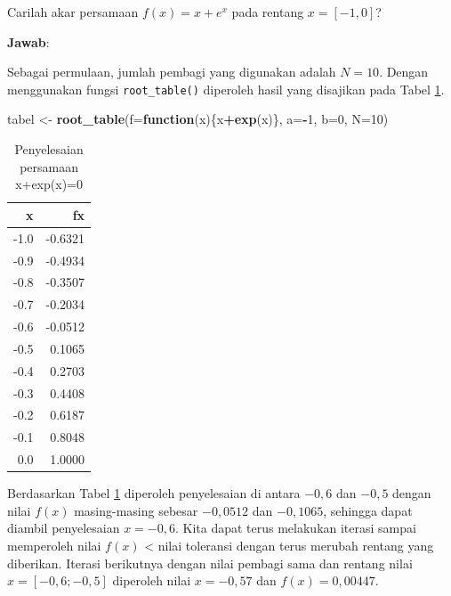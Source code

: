 \documentclass[]{book}
\newenvironment{Shaded}{\begin{snugshade}}{\end{snugshade}}
\newcommand{\ControlFlowTok}[1]{\textcolor[rgb]{0.13,0.29,0.53}{\textbf{#1}}}
\newcommand{\DataTypeTok}[1]{\textcolor[rgb]{0.13,0.29,0.53}{#1}}
\newcommand{\DecValTok}[1]{\textcolor[rgb]{0.00,0.00,0.81}{#1}}
\newcommand{\KeywordTok}[1]{\textcolor[rgb]{0.13,0.29,0.53}{\textbf{#1}}}
\newcommand{\NormalTok}[1]{#1}
\newcommand{\OperatorTok}[1]{\textcolor[rgb]{0.81,0.36,0.00}{\textbf{#1}}}
\newcommand{\StringTok}[1]{\textcolor[rgb]{0.31,0.60,0.02}{#1}}
\theoremstyle{definition}
\theoremstyle{definition}
\theoremstyle{definition}
\theoremstyle{remark}
\let\BeginKnitrBlock\begin \let\EndKnitrBlock\end
\begin{document}
\BeginKnitrBlock{example}
\protect\hypertarget{exm:tabelexmp}{}{\label{exm:tabelexmp} }Carilah akar persamaan \(f\left(x \right)=x+e^{x}\) pada rentang \(x=\left[-1,0 \right]\)?
\EndKnitrBlock{example}

\textbf{Jawab}:

Sebagai permulaan, jumlah pembagi yang digunakan adalah \(N=10\). Dengan menggunakan fungsi \texttt{root\_table()} diperoleh hasil yang disajikan pada Tabel \ref{tab:tabeltabel}.

\begin{Shaded}
\begin{Highlighting}[]
\NormalTok{tabel <-}\StringTok{ }\KeywordTok{root_table}\NormalTok{(}\DataTypeTok{f=}\ControlFlowTok{function}\NormalTok{(x)\{x}\OperatorTok{+}\KeywordTok{exp}\NormalTok{(x)\},}
                     \DataTypeTok{a=}\OperatorTok{-}\DecValTok{1}\NormalTok{, }\DataTypeTok{b=}\DecValTok{0}\NormalTok{, }\DataTypeTok{N=}\DecValTok{10}\NormalTok{)}
\end{Highlighting}
\end{Shaded}

\begin{table}[t]

\caption{\label{tab:tabeltabel}Penyelesaian persamaan x+exp(x)=0}
\centering
\begin{tabular}{r|r}
\hline
x & fx\\
\hline
-1.0 & -0.6321\\
\hline
-0.9 & -0.4934\\
\hline
-0.8 & -0.3507\\
\hline
-0.7 & -0.2034\\
\hline
-0.6 & -0.0512\\
\hline
-0.5 & 0.1065\\
\hline
-0.4 & 0.2703\\
\hline
-0.3 & 0.4408\\
\hline
-0.2 & 0.6187\\
\hline
-0.1 & 0.8048\\
\hline
0.0 & 1.0000\\
\hline
\end{tabular}
\end{table}

Berdasarkan Tabel \ref{tab:tabeltabel} diperoleh penyelesaian di antara \(-0,6\) dan \(-0,5\) dengan nilai \(f\left(x \right)\) masing-masing sebesar \(-0,0512\) dan \(-0,1065\), sehingga dapat diambil penyelesaian \(x=-0,6\). Kita dapat terus melakukan iterasi sampai memperoleh nilai \(f\left(x \right)\) \textless{} nilai toleransi dengan terus merubah rentang yang diberikan. Iterasi berikutnya dengan nilai pembagi sama dan rentang nilai \(x=\left[-0,6;-0,5\right]\) diperoleh nilai \(x=-0,57\) dan \(f\left(x \right)=0,00447\).
\end{document}
